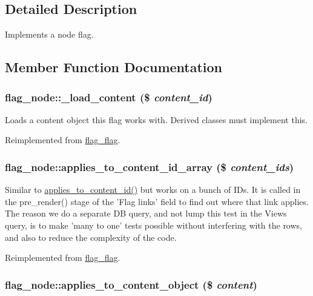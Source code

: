 \subsection{Detailed Description}
Implements a node flag. 

\subsection{Member Function Documentation}
\hypertarget{classflag__node_3e41593b4effc42f96b500f16b2a3c12}{
\subsubsection[{\_\-load\_\-content}]{\setlength{\rightskip}{0pt plus 5cm}flag\_\-node::\_\-load\_\-content (\$ {\em content\_\-id})}}
\label{classflag__node_3e41593b4effc42f96b500f16b2a3c12}


Loads a content object this flag works with. Derived classes must implement this.

Reimplemented from \hyperlink{classflag__flag}{flag\_\-flag}.\hypertarget{classflag__node_c1e88f053ece925c7f28c0e8fe4b020f}{
\subsubsection[{applies\_\-to\_\-content\_\-id\_\-array}]{\setlength{\rightskip}{0pt plus 5cm}flag\_\-node::applies\_\-to\_\-content\_\-id\_\-array (\$ {\em content\_\-ids})}}
\label{classflag__node_c1e88f053ece925c7f28c0e8fe4b020f}


Similar to \hyperlink{classflag__flag_a38afcc59d7d1ef028215521c6fcdc22}{applies\_\-to\_\-content\_\-id()} but works on a bunch of IDs. It is called in the pre\_\-render() stage of the 'Flag links' field to find out where that link applies. The reason we do a separate DB query, and not lump this test in the Views query, is to make 'many to one' tests possible without interfering with the rows, and also to reduce the complexity of the code. 

Reimplemented from \hyperlink{group__views_g7ffe2653803be84d2c2d21dea608a6da}{flag\_\-flag}.\hypertarget{classflag__node_d2b546768e89ad2622ba698f22146df8}{
\subsubsection[{applies\_\-to\_\-content\_\-object}]{\setlength{\rightskip}{0pt plus 5cm}flag\_\-node::applies\_\-to\_\-content\_\-object (\$ {\em content})}}
\label{classflag__node_d2b546768e89ad2622ba698f22146df8}


